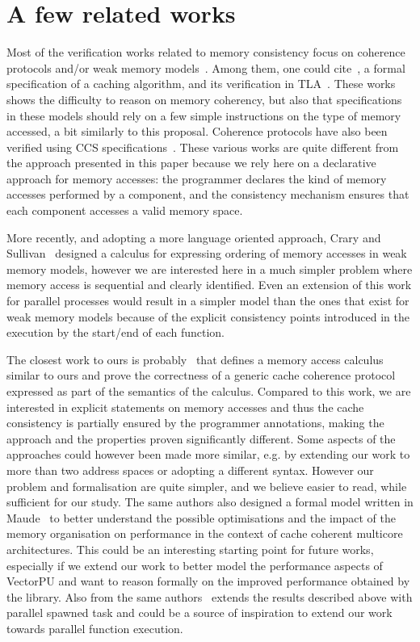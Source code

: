 \documentclass[preprint,12pt]{elsarticle}
\begin{document}
\section{A few related works}\label{sec:RW} 
Most of the verification works related to memory consistency focus on coherence 
protocols 
and/or 
weak memory models~\cite{pong1997verification}. 
Among them, one could cite~\cite{Gerth1999}, a formal specification of a caching 
algorithm, and its verification in TLA~\cite{Ladkin1999}. These works shows the 
difficulty to reason on memory coherency, but also that specifications in these models 
should rely on a few simple instructions on the type of memory accessed, a bit similarly 
to this proposal.
Coherence protocols have also been verified using CCS specifications~\cite{Barrio01}. 
These various works are quite different from the approach presented in this paper because 
we rely here on a declarative approach for memory accesses: the programmer declares the 
kind of memory accesses performed by a component, and the consistency mechanism ensures 
that each component accesses a valid memory space.

More recently, and adopting a more language oriented approach, Crary and 
Sullivan~\cite{Crary:POPL:2015} designed 
a calculus for expressing ordering of memory accesses in weak memory models, however we 
are interested here in a much simpler problem where memory access is  sequential 
and clearly identified. 
Even an  extension of this work for parallel processes would  result in a 
simpler model than the ones that exist for weak memory models because of the explicit 
consistency points introduced in the execution by the start/end of each function. 

The closest work to ours is probably~\cite{BJPTSAC16} that defines a memory access calculus similar to ours and prove the 
correctness of a generic cache coherence protocol expressed as part of the semantics of 
the calculus. Compared to this work, we are interested in explicit statements on memory 
accesses and thus the cache consistency is partially ensured  by the programmer 
annotations, making the approach and the properties proven significantly different. Some 
aspects of the approaches could however been made more similar, e.g. by extending our 
work to more than two address spaces or adopting a different  syntax. However our problem 
and formalisation are quite simpler, and we 
believe easier to read, while sufficient for our study.
The same authors also designed a formal model written in Maude~\cite{BJPTMaude16} to 
better understand the possible 
optimisations and the impact of the memory organisation on performance in the context of 
cache coherent multicore architectures. This could be an interesting starting point for 
future works, especially if we 
extend our work to better model the performance aspects of VectorPU and want to reason 
formally on the improved performance obtained by the library. Also from the same authors~\cite{Bijo2017} extends the results described above with parallel spawned task and could be a source of inspiration  to extend our work towards parallel function execution.
\end{document}
